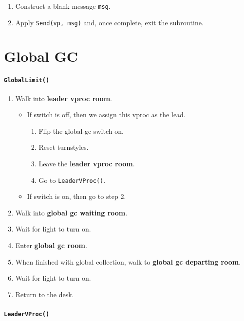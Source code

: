 \documentclass[11pt]{article}
\begin{document}
{\begin{enumerate}
  \item Construct a blank message \texttt{msg}.
  \item Apply \texttt{Send(vp, msg)} and, once complete, exit the subroutine.
\end{enumerate}

\section{Global GC}

\paragraph{\texttt{GlobalLimit()}}

\begin{enumerate}
  \item Walk into \textbf{leader vproc room}.
    \begin{itemize}
      \item If switch is off, then we assign this vproc as the lead.
        \begin{enumerate}
          \item Flip the global-gc switch on.
          \item Reset turnstyles.
          \item Leave the \textbf{leader vproc room}.
          \item Go to \texttt{LeaderVProc()}.
        \end{enumerate}
      \item If switch is on, then go to step 2.
    \end{itemize}
  \item Walk into \textbf{global gc waiting room}.
  \item Wait for light to turn on.
  \item Enter \textbf{global gc room}.
  \item When finished with global collection, walk to \textbf{global gc departing room}.
  \item Wait for light to turn on.
  \item Return to the desk.
\end{enumerate}

\paragraph{\texttt{LeaderVProc()}}

}
\end{document}
